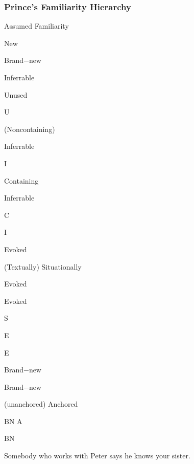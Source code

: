 \documentclass[compress,color=usenames]{beamer}
\begin{document}
\begin{frame}
\frametitle{
Prince's Familiarity Hierarchy}



Assumed Familiarity






New






Brand$-$new






Inferrable






Unused



U






(Noncontaining)



Inferrable



I






Containing



Inferrable



C



I






Evoked






(Textually) Situationally



Evoked



Evoked



S



E



E






Brand$-$new



Brand$-$new



(unanchored) Anchored



BN A



BN






Somebody who works with Peter says he knows your sister.










\end{frame}
\end{document}
